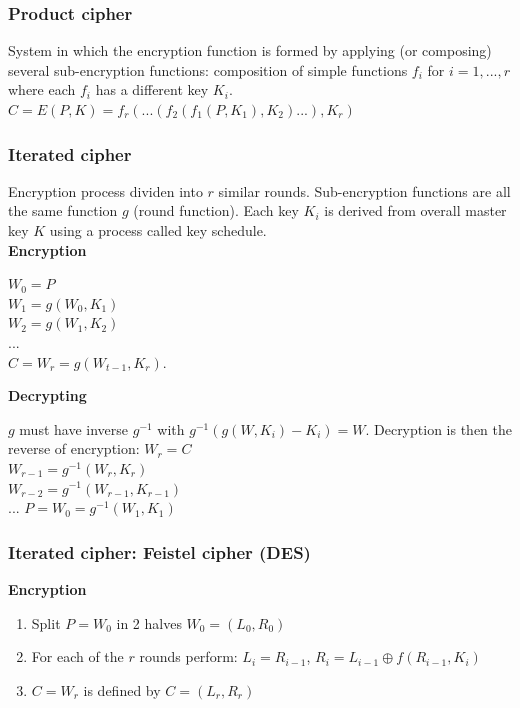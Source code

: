 \documentclass{article}
\begin{document}
\subsubsection{Product cipher}

System in which the encryption function is formed by applying (or composing) several sub-encryption functions: composition of simple functions $f_i$ for $i=1,..., r$ where each $f_i$ has a different key $K_i$.\\
$C = E(P,K) = f_r (...(f_2(f_1(P,K_1),K_2)...),K_r)$

\subsubsection{Iterated cipher}

Encryption process dividen into $r$ similar rounds. Sub-encryption functions are all the same function $g$ (round function). Each key $K_i$ is derived from overall master key $K$ using a process called key schedule.\\

\textbf{Encryption}

$W_0 = P$\\
$W_1 = g(W_0, K_1)$\\
$W_2 = g(W_1, K_2)$\\
...\\
$C = W_r = g(W_{t-1}, K_r)$.

\textbf{Decrypting}

$g$ must have inverse $g^{-1}$ with $g^{-1}(g(W,K_i)-K_i) = W$. Decryption is then the reverse of encryption:
$W_r = C$\\
$W_{r-1} = g^{-1}(W_r,K_r)$\\
$W_{r-2} = g^{-1}(W_{r-1},K_{r-1})$\\
...
$P = W_0 = g^{-1}(W_1,K_1)$\\

\subsubsection{Iterated cipher: Feistel cipher (DES)}

\textbf{Encryption}

\begin{enumerate}
    \item Split $P = W_0$ in 2 halves $W_0 = (L_0, R_0)$
    \item For each of the $r$ rounds perform: $L_i = R_{i-1}$, $R_i = L_{i-1} \oplus f(R_{i-1}, K_i)$
    \item $C = W_r$ is defined by $C = (L_r, R_r)$
\end{enumerate}
\end{document}
